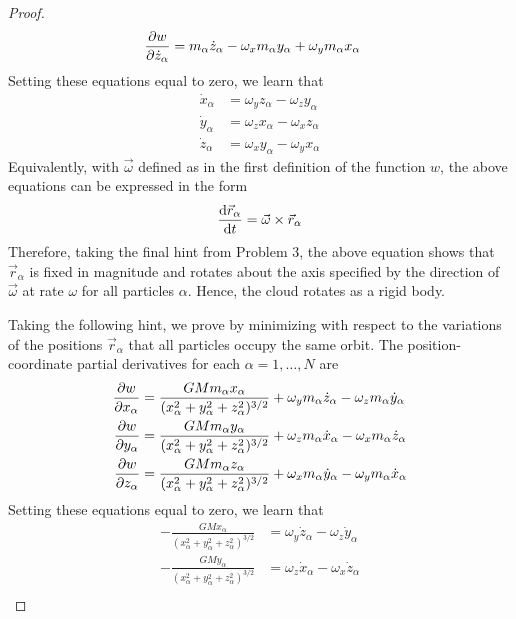\documentclass[../psets.tex]{subfiles}
\begin{document}
\begin{enumerate}
\begin{proof}
\begin{align*}
            \pdv{w}{\dot{z}_\alpha} &= m_\alpha\dot{z}_\alpha-\omega_xm_\alpha y_\alpha+\omega_ym_\alpha x_\alpha
        \end{align*}
        Setting these equations equal to zero, we learn that
        \begin{align*}
            \dot{x}_\alpha &= \omega_yz_\alpha-\omega_zy_\alpha\\
            \dot{y}_\alpha &= \omega_zx_\alpha-\omega_xz_\alpha\\
            \dot{z}_\alpha &= \omega_xy_\alpha-\omega_yx_\alpha
        \end{align*}
        Equivalently, with $\vec{\omega}$ defined as in the first definition of the function $w$, the above equations can be expressed in the form
        \begin{equation*}
            \dv{\vec{r}_\alpha}{t} = \vec{\omega}\times\vec{r}_\alpha
        \end{equation*}
        Therefore, taking the final hint from Problem 3, the above equation shows that $\vec{r}_\alpha$ is fixed in magnitude and rotates about the axis specified by the direction of $\vec{\omega}$ at rate $\omega$ for all particles $\alpha$. Hence, the cloud rotates as a rigid body.\par
        Taking the following hint, we prove by minimizing with respect to the variations of the positions $\vec{r}_\alpha$ that all particles occupy the same orbit. The position-coordinate partial derivatives for each $\alpha=1,\dots,N$ are
        \begin{align*}
            \pdv{w}{x_\alpha} &= \frac{GMm_\alpha x_\alpha}{(x_\alpha^2+y_\alpha^2+z_\alpha^2)^{3/2}}+\omega_ym_\alpha\dot{z}_\alpha-\omega_zm_\alpha\dot{y}_\alpha\\
            \pdv{w}{y_\alpha} &= \frac{GMm_\alpha y_\alpha}{(x_\alpha^2+y_\alpha^2+z_\alpha^2)^{3/2}}+\omega_zm_\alpha\dot{x}_\alpha-\omega_xm_\alpha\dot{z}_\alpha\\
            \pdv{w}{z_\alpha} &= \frac{GMm_\alpha z_\alpha}{(x_\alpha^2+y_\alpha^2+z_\alpha^2)^{3/2}}+\omega_xm_\alpha\dot{y}_\alpha-\omega_ym_\alpha\dot{x}_\alpha
        \end{align*}
        Setting these equations equal to zero, we learn that
        \begin{align*}
            -\frac{GMx_\alpha}{(x_\alpha^2+y_\alpha^2+z_\alpha^2)^{3/2}} &= \omega_y\dot{z}_\alpha-\omega_z\dot{y}_\alpha\\
            -\frac{GMy_\alpha}{(x_\alpha^2+y_\alpha^2+z_\alpha^2)^{3/2}} &= \omega_z\dot{x}_\alpha-\omega_x\dot{z}_\alpha\\

\end{align*}
\end{proof}
\end{enumerate}
\end{document}
